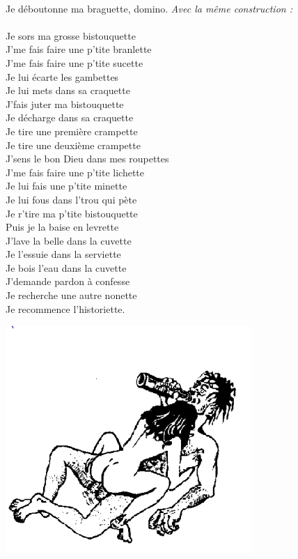 \\Je déboutonne ma braguette, domino.
\breakpage
\textit{Avec la même construction :}
\\\\Je sors ma grosse bistouquette
\\J'me fais faire une p'tite branlette
\\J'me fais faire une p'tite sucette
\\Je lui écarte les gambettes
\\Je lui mets dans sa craquette
\\J'fais juter ma bistouquette
\\Je décharge dans sa craquette
\\Je tire une première crampette
\\Je tire une deuxième crampette
\\J'sens le bon Dieu dans mes roupettes
\\J'me fais faire une p'tite lichette
\\Je lui fais une p'tite minette
\\Je lui fous dans l'trou qui pète
\\Je r'tire ma p'tite bistouquette
\\Puis je la baise en levrette
\\J'lave la belle dans la cuvette
\\Je l'essuie dans la serviette
\\Je bois l'eau dans la cuvette
\\J'demande pardon à confesse
\\Je recherche une autre nonette
\\Je recommence l'historiette.
\\
\bigskip
\begin{center}
\includegraphics[width=0.7\textwidth]{images/image1.PNG}
\end{center}
\breakpage